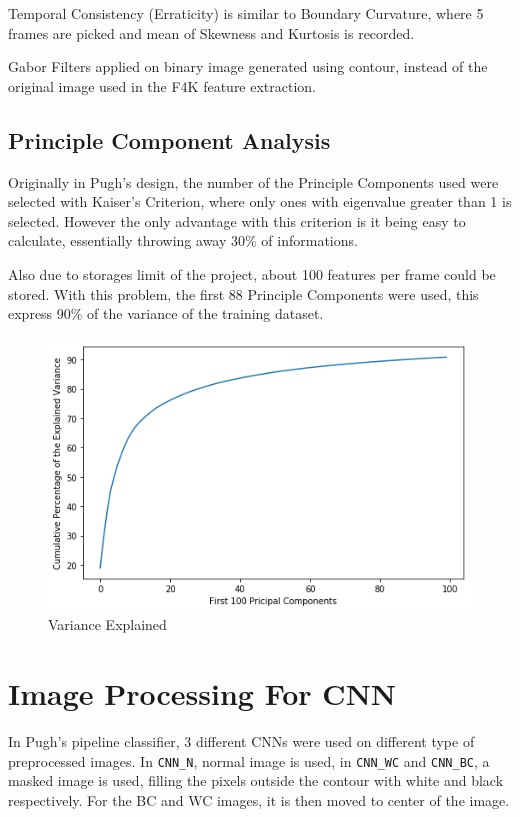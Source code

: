 \documentclass[bsc,logo,twoside,fullspacing,parskip]{infthesis}
\begin{document}
Temporal Consistency (Erraticity) is similar to Boundary Curvature, where 5 frames are picked and mean of Skewness and Kurtosis is recorded.

Gabor Filters applied on binary image generated using contour, instead of the original image used in the F4K feature extraction. 

\subsection{Principle Component Analysis}

Originally in Pugh's design, the number of the Principle Components used were selected with Kaiser's Criterion, where only ones with eigenvalue greater than 1 is selected. However the only advantage with this criterion is it being easy to calculate, essentially throwing away 30\% of informations.

Also due to storages limit of the project, about 100 features per frame could be stored. With this problem, the first 88 Principle Components were used, this express 90\% of the variance of the training dataset.

\begin{figure}[ht]
\centering
    \includegraphics[scale=0.40]{graph/pcas.png}
    \caption{Variance Explained}
    \label{fig:pcsused}
\end{figure}

\section{Image Processing For CNN}

In Pugh's pipeline classifier, 3 different CNNs were used on different type of preprocessed images.
In  {\tt CNN\_N}, normal image is used, in {\tt CNN\_WC} and {\tt CNN\_BC}, a masked image is used, filling the pixels outside the contour with white and black respectively.
For the BC and WC images, it is then moved to center of the image.
\end{document}
